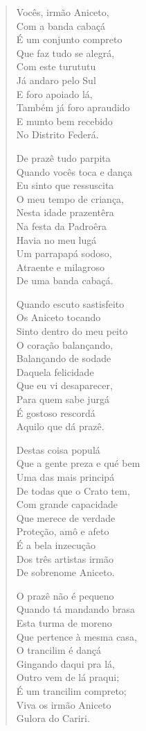 \begin{verse}
Vocês, irmão Aniceto,\\
Com a banda cabaçá\\
É um conjunto compreto\\
Que faz tudo se alegrá,\\
Com este turututu\\
Já andaro pelo Sul\\
E foro apoiado lá,\\
Também já foro apraudido\\
E munto bem recebido\\
No Distrito Federá.

De prazê tudo parpita\\
Quando vocês toca e dança\\
Eu sinto que ressuscita\\
O meu tempo de criança,\\
Nesta idade prazentêra\\
Na festa da Padroêra\\
Havia no meu lugá\\
Um parrapapá sodoso,\\
Atraente e milagroso\\
De uma banda cabaçá.

Quando escuto sastisfeito\\
Os Aniceto tocando\\
Sinto dentro do meu peito\\
O coração balançando,\\
Balançando de sodade\\
Daquela felicidade\\
Que eu vi desaparecer,\\
Para quem sabe jurgá\\
É gostoso rescordá\\
Aquilo que dá prazê.

Destas coisa populá\\
Que a gente preza e qué bem\\
Uma das mais principá\\
De todas que o Crato tem,\\
Com grande capacidade\\
Que merece de verdade\\
Proteção, amô e afeto\\
É a bela inzecução\\
Dos três artistas irmão\\
De sobrenome Aniceto.

O prazê não é pequeno\\
Quando tá mandando brasa\\
Esta turma de moreno\\
Que pertence à mesma casa,\\
O trancilim é dançá\\
Gingando daqui pra lá,\\
Outro vem de lá praqui;\\
É um trancilim compreto;\\
Viva os irmão Aniceto\\
Gulora do Cariri.
\end{verse}

